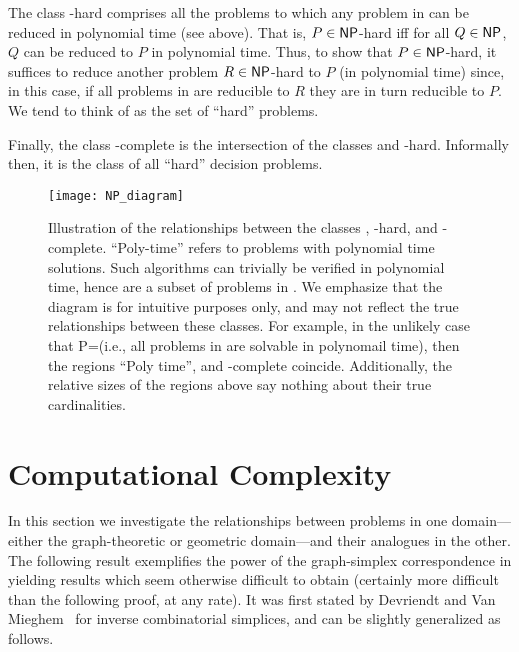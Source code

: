 The class \NP-hard comprises all the problems to  which  any problem in \NP can be reduced in polynomial time (see above). That is, $P\in{\normalfont\textsf{NP}}$-hard iff for all  $Q\in{\normalfont\textsf{NP}}$,  $Q$ can be  reduced to $P$ in polynomial time. Thus,  to show that $P\in{\normalfont\textsf{NP}}$-hard, it suffices to reduce another problem $R\in{\normalfont\textsf{NP}}$-hard to  $P$ (in polynomial time) since,  in this  case, if all problems in \NP are  reducible  to  $R$  they are in turn  reducible  to  $P$. We  tend to think of \NP as the set of ``hard'' problems. 

Finally,  the class \NP-complete is the intersection of the classes \NP and  \NP-hard. Informally then, it is  the  class of all ``hard'' decision problems. 

\begin{figure}
	\centering
	\texttt{[image: NP\_diagram]}
	\caption{Illustration of the relationships between the  classes \NP,  \NP-hard, and \NP-complete. ``Poly-time'' refers to problems with polynomial time solutions. Such algorithms can trivially be verified  in polynomial time, hence  are a  subset of problems in \NP. We emphasize that the diagram is  for intuitive purposes only,  and may not reflect the true relationships between these classes. For example, in  the unlikely  case that \textsf{P}=\NP (i.e., all problems in  \NP are solvable in polynomail time), then the regions ``Poly time'', \NP and \NP-complete coincide. Additionally, the relative sizes of the regions above say  nothing about  their  true  cardinalities.}
\end{figure}



\section{Computational Complexity}
\label{sec:algorithmics_complexity}

In this section we investigate the relationships between problems in one domain---either the graph-theoretic or geometric domain---and their analogues in the other. The following result exemplifies the power of the graph-simplex correspondence in yielding results which seem otherwise difficult to obtain (certainly more difficult than the following proof, at any rate).  
It was first stated by Devriendt and Van Mieghem~\cite{devriendt2018simplex} for inverse combinatorial  simplices, and can be slightly generalized as follows.  

